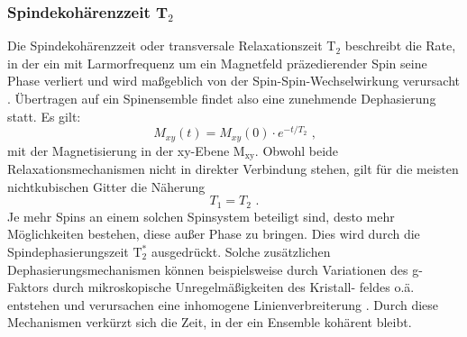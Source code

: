 \subsubsection{Spindekohärenzzeit T$_\text{2}$} Die Spindekohärenzzeit oder
transversale Relaxationszeit T$_\text{2}$ beschreibt die Rate, in der ein mit
Larmorfrequenz um ein Magnetfeld präzedierender Spin seine Phase verliert und
wird maßgeblich von der Spin-Spin-Wechselwirkung verursacht \cite{Fabian.2007}.
Übertragen auf ein Spinensemble findet also eine zunehmende Dephasierung statt.
Es gilt: \begin{equation} M_{xy}(t)=M_{xy}(0)\cdot e^{-t/T_2} \text{ ,}
\end{equation} mit der Magnetisierung in der xy-Ebene $\text{M}_\text{xy}$.
Obwohl beide Relaxationsmechanismen nicht in direkter Verbindung stehen, gilt
für die meisten nichtkubischen Gitter die Näherung \cite{Fabian.2007}
\begin{equation} T_1 = T_2 \text{ .} \end{equation} Je mehr Spins an einem
solchen Spinsystem beteiligt sind, desto mehr Möglichkeiten bestehen, diese
außer Phase zu bringen. Dies wird durch die Spindephasierungszeit
$\text{T}_\text{2}^\ast$ ausgedrückt. Solche zusätzlichen
Dephasierungsmechanismen können beispielsweise durch Variationen des g-Faktors
durch mikroskopische Unregelmäßigkeiten des Kristall- feldes o.ä. entstehen und
verursachen eine inhomogene Linienverbreiterung \cite{Fabian.2007}. Durch diese
Mechanismen verkürzt sich die Zeit, in der ein Ensemble kohärent bleibt.
